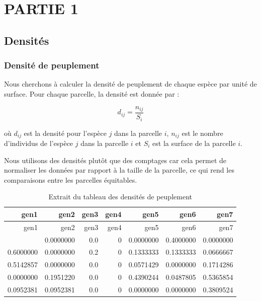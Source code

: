 \documentclass[
]{article}
\begin{document}
\hypertarget{partie-1}{%
\section{PARTIE 1}\label{partie-1}}

\hypertarget{densituxe9s}{%
\subsection{Densités}\label{densituxe9s}}

\hypertarget{densituxe9-de-peuplement}{%
\subsubsection{Densité de peuplement}\label{densituxe9-de-peuplement}}

Nous cherchons à calculer la densité de peuplement de chaque espèce par
unité de surface. Pour chaque parcelle, la densité est donnée par :

\[
d_{ij} = \frac{n_{ij}}{S_{i}}
\]

où \(d_{ij}\) est la densité pour l'espèce \(j\) dans la parcelle \(i\),
\(n_{ij}\) est le nombre d'individus de l'espèce \(j\) dans la parcelle
\(i\) et \(S_{i}\) est la surface de la parcelle \(i\).

Nous utilisons des densités plutôt que des comptages car cela permet de
normaliser les données par rapport à la taille de la parcelle, ce qui
rend les comparaisons entre les parcelles équitables.

\begin{longtable}[]{@{}rrrrrrr@{}}
\caption{Extrait du tableau des densités de peuplement}\tabularnewline
\toprule\noalign{}
gen1 & gen2 & gen3 & gen4 & gen5 & gen6 & gen7 \\
\midrule\noalign{}
\endfirsthead
\toprule\noalign{}
gen1 & gen2 & gen3 & gen4 & gen5 & gen6 & gen7 \\
\midrule\noalign{}
\endhead
\bottomrule\noalign{}
\endlastfoot
0.0000000 & 0.0000000 & 0.0 & 0 & 0.0000000 & 0.4000000 & 0.0000000 \\
0.6000000 & 0.0000000 & 0.2 & 0 & 0.1333333 & 0.1333333 & 0.0666667 \\
0.5142857 & 0.0000000 & 0.0 & 0 & 0.0571429 & 0.0000000 & 0.1714286 \\
0.0000000 & 0.1951220 & 0.0 & 0 & 0.4390244 & 0.0487805 & 0.5365854 \\
0.0952381 & 0.0952381 & 0.0 & 0 & 0.0000000 & 0.0000000 & 0.3809524 \\
\end{longtable}
\end{document}

